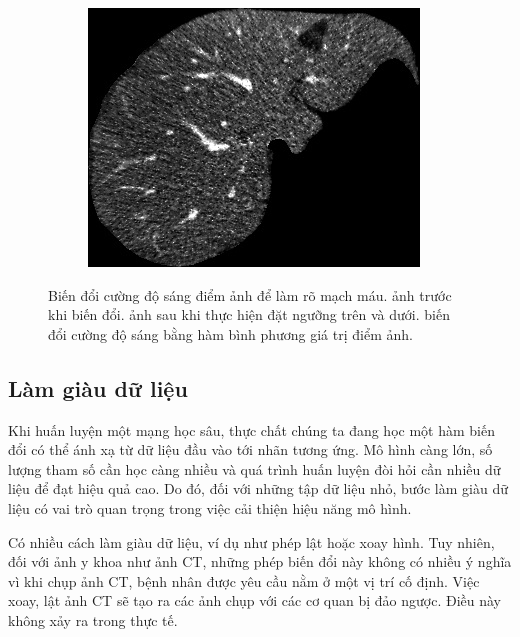 \begin{figure}[h!]
\begin{subfigure}[b]{0.32\textwidth}
			\caption{}
			\label{fig:pre_processing_intensity_clamp}
		\end{subfigure}
		\hfill
		\begin{subfigure}[b]{0.32\textwidth}
			\includegraphics[width=\textwidth]{figures/pre_processing_intensity_gamma}
			\caption{}
			\label{fig:pre_processing_intensity_gamma}
		\end{subfigure}
		\caption[Biến đổi cường độ sáng điểm ảnh để làm rõ mạch máu.]{Biến đổi cường độ sáng điểm ảnh để làm rõ mạch máu.  ảnh trước khi biến đổi.  ảnh sau khi thực hiện đặt ngưỡng trên và dưới.  biến đổi cường độ sáng bằng hàm bình phương giá trị điểm ảnh.}
		\label{fig:pre_processing_intensity}
	\end{figure}

\subsection{Làm giàu dữ liệu} 
\label{subsec:lam_giau_du_lieu}
	Khi huấn luyện một mạng học sâu, thực chất chúng ta đang học một hàm biến đổi có thể ánh xạ từ dữ liệu đầu vào tới nhãn tương ứng. Mô hình càng lớn, số lượng tham số cần học càng nhiều và quá trình huấn luyện đòi hỏi cần nhiều dữ liệu để đạt hiệu quả cao. Do đó, đối với những tập dữ liệu nhỏ, bước làm giàu dữ liệu có vai trò quan trọng trong việc cải thiện hiệu năng mô hình.
	
	Có nhiều cách làm giàu dữ liệu, ví dụ như phép lật hoặc xoay hình. Tuy nhiên, đối với ảnh y khoa như ảnh CT, những phép biến đổi này không có nhiều ý nghĩa vì khi chụp ảnh CT, bệnh nhân được yêu cầu nằm ở một vị trí cố định. Việc xoay, lật ảnh CT sẽ tạo ra các ảnh chụp với các cơ quan bị đảo ngược. Điều này không xảy ra trong thực tế.
	
